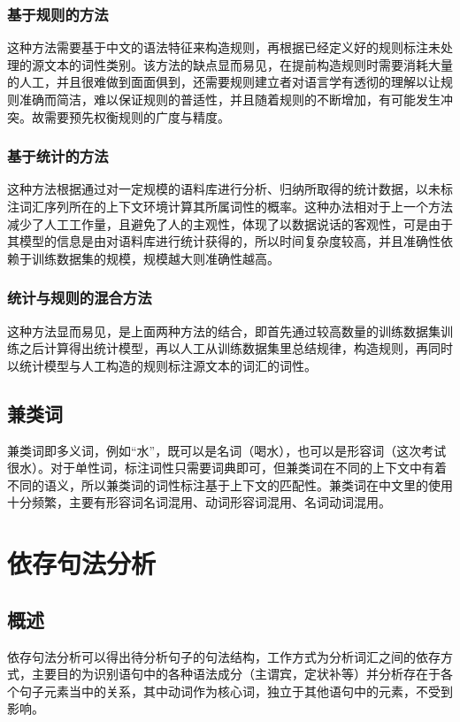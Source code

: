 \subsubsection{基于规则的方法}
这种方法需要基于中文的语法特征来构造规则，再根据已经定义好的规则标注未处理的源文本的词性类别。该方法的缺点显而易见，在提前构造规则时需要消耗大量的人工，并且很难做到面面俱到，还需要规则建立者对语言学有透彻的理解以让规则准确而简洁，难以保证规则的普适性，并且随着规则的不断增加，有可能发生冲突。故需要预先权衡规则的广度与精度。

\subsubsection{基于统计的方法}
这种方法根据通过对一定规模的语料库进行分析、归纳所取得的统计数据，以未标注词汇序列所在的上下文环境计算其所属词性的概率。这种办法相对于上一个方法减少了人工工作量，且避免了人的主观性，体现了以数据说话的客观性，可是由于其模型的信息是由对语料库进行统计获得的，所以时间复杂度较高，并且准确性依赖于训练数据集的规模，规模越大则准确性越高。

\subsubsection{统计与规则的混合方法}
这种方法显而易见，是上面两种方法的结合，即首先通过较高数量的训练数据集训练之后计算得出统计模型，再以人工从训练数据集里总结规律，构造规则，再同时以统计模型与人工构造的规则标注源文本的词汇的词性。

\subsection{兼类词}
兼类词即多义词，例如“水”，既可以是名词（喝水），也可以是形容词（这次考试很水）。对于单性词，标注词性只需要词典即可，但兼类词在不同的上下文中有着不同的语义，所以兼类词的词性标注基于上下文的匹配性。兼类词在中文里的使用十分频繁，主要有形容词名词混用、动词形容词混用、名词动词混用。

\section{依存句法分析}
\subsection{概述}
依存句法分析可以得出待分析句子的句法结构，工作方式为分析词汇之间的依存方式，主要目的为识别语句中的各种语法成分（主谓宾，定状补等）并分析存在于各个句子元素当中的关系，其中动词作为核心词，独立于其他语句中的元素，不受到影响。

